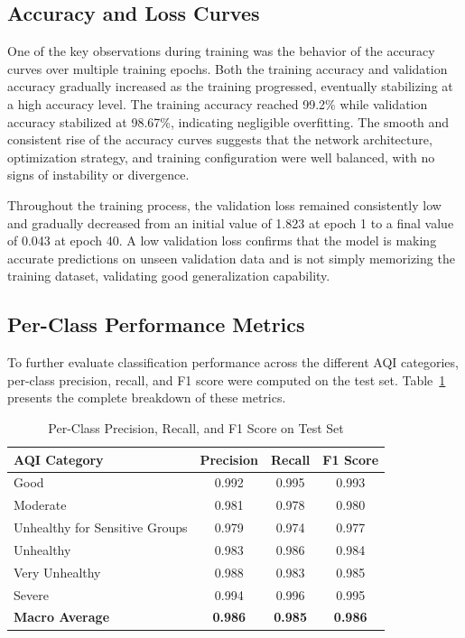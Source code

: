 \documentclass[conference]{IEEEtran}
\begin{document}
\subsection{Accuracy and Loss Curves}

One of the key observations during training was the behavior of the accuracy
curves over multiple training epochs. Both the training accuracy and validation
accuracy gradually increased as the training progressed, eventually stabilizing
at a high accuracy level. The training accuracy reached 99.2\% while
validation accuracy stabilized at 98.67\%, indicating negligible overfitting.
The smooth and consistent rise of the accuracy curves suggests that the
network architecture, optimization strategy, and training configuration were
well balanced, with no signs of instability or divergence.

Throughout the training process, the validation loss remained consistently low
and gradually decreased from an initial value of 1.823 at epoch 1 to a final
value of 0.043 at epoch 40. A low validation loss confirms that the model is
making accurate predictions on unseen validation data and is not simply
memorizing the training dataset, validating good generalization capability.

\subsection{Per-Class Performance Metrics}

To further evaluate classification performance across the different AQI
categories, per-class precision, recall, and F1 score were computed on the
test set. Table~\ref{tab:classmetrics} presents the complete breakdown of
these metrics.

\begin{table}[h]
  \centering
  \caption{Per-Class Precision, Recall, and F1 Score on Test Set}
  \label{tab:classmetrics}
  \renewcommand{\arraystretch}{1.3}
  \begin{tabular}{lccc}
    \toprule
    \textbf{AQI Category} & \textbf{Precision} & \textbf{Recall} & \textbf{F1 Score} \\
    \midrule
    Good                          & 0.992 & 0.995 & 0.993 \\
    Moderate                      & 0.981 & 0.978 & 0.980 \\
    Unhealthy for Sensitive Groups & 0.979 & 0.974 & 0.977 \\
    Unhealthy                     & 0.983 & 0.986 & 0.984 \\
    Very Unhealthy                & 0.988 & 0.983 & 0.985 \\
    Severe                        & 0.994 & 0.996 & 0.995 \\
    \midrule
    \textbf{Macro Average}        & \textbf{0.986} & \textbf{0.985} & \textbf{0.986} \\
    \bottomrule
  \end{tabular}
\end{table}
\end{document}
